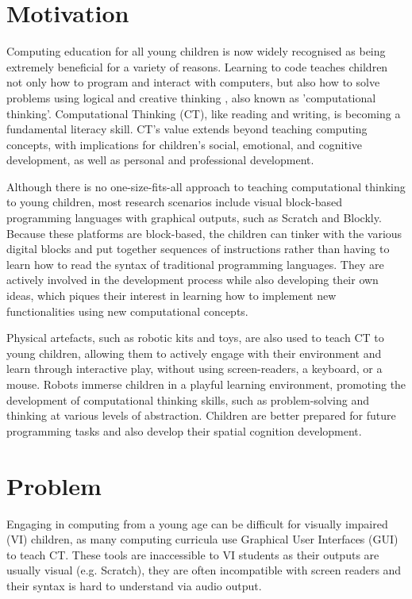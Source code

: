 \documentclass[oneside,%
                    author={Malak Hajji},
                    degree={BSc},
                    title={Designing An Accessible Computational Toolkit For Students},
                  subtitle={With Mixed Visual Abilities}]{dissertation}
\begin{document}
\section{Motivation}
Computing education for all young children is now widely recognised as being extremely beneficial for a variety of reasons. Learning to code teaches children not only how to program and interact with computers, but also how to solve problems using logical and creative thinking \cite{CB-intro1}, also known as 'computational thinking'. Computational Thinking (CT), like reading and writing, is becoming a fundamental literacy skill. CT's value extends beyond teaching computing concepts, with implications for children's social, emotional, and cognitive development\cite{intro,cognition-intro}, as well as personal and professional development\cite{CB-CT1}. 

Although there is no one-size-fits-all approach to teaching computational thinking to young children, most research scenarios include visual block-based programming languages with graphical outputs, such as Scratch\cite{scratch} and Blockly\cite{blockly}. Because these platforms are block-based, the children can tinker with the various digital blocks and put together sequences of instructions rather than having to learn how to read the syntax of traditional programming languages. They are actively involved in the development process while also developing their own ideas, which piques their interest in learning how to implement new functionalities using new computational concepts.

Physical artefacts, such as robotic kits and toys, are also used to teach CT to young children, allowing them to actively engage with their environment and learn through interactive play, without using screen-readers, a keyboard, or a mouse. Robots immerse children in a playful learning environment, promoting the development of computational thinking skills, such as problem-solving and thinking at various levels of abstraction. Children are better prepared for future programming tasks and also develop their spatial cognition development\cite{intro-robots}.

\section{Problem}
Engaging in computing from a young age can be difficult for visually impaired (VI) children, as many computing curricula use Graphical User Interfaces (GUI) to teach CT. These tools are inaccessible to VI students as their outputs are usually visual (e.g. Scratch), they are often incompatible with screen readers and their syntax is hard to understand via audio output.
\end{document}
